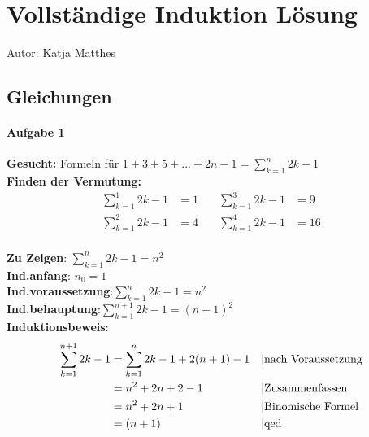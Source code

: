 \chapter{Vollständige Induktion Lösung}
Autor: Katja Matthes
\section{Gleichungen}
\subsubsection{Aufgabe 1}
\textbf{Gesucht:} Formeln für $ 1 + 3 + 5 + ... + 2n-1 = \sum_{k=1}^n 2k-1 $ \\
\textbf{Finden der Vermutung:}\begin{align*} 	\sum_{k=1}^1 2k-1 &= 1 &\quad \sum_{k=1}^3 2k-1 &= 9 \\
																							\sum_{k=1}^2 2k-1 &= 4 &\quad \sum_{k=1}^4 2k-1 &= 16	\end{align*}\\
\textbf{Zu Zeigen}: \quad							$\sum_{k=1}^n 2k-1 = n^2 $ \\
\textbf{Ind.anfang}: \quad$n_0 = 1$ \\
\textbf{Ind.voraussetzung}:\quad $\sum_{k=1}^n 2k-1 = n^2$ \\
\textbf{Ind.behauptung}:\quad$ \sum_{k=1}^{n+1} 2k-1 = (n+1)^2$ \\
\textbf{Induktionsbeweis}: \begin{align*}
	\sum_{k=1}^{n+1} 2k-1 &= \sum_{k=1}^n 2k-1 + 2(n+1)-1 && \text{\textbar nach Voraussetzung}\\
												&= n^2 + 2n+2-1 								&& \text{\textbar Zusammenfassen}\\
												&= n^2 + 2n + 1 								&& \text{\textbar Binomische Formel}\\
												&= (n+1)												&& \text{\textbar qed}\end{align*}
